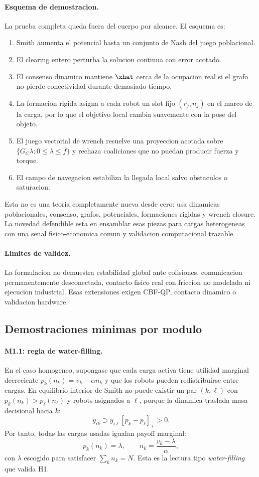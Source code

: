 \paragraph{Esquema de demostracion.}
La prueba completa queda fuera del cuerpo por alcance. El esquema es:
\begin{enumerate}[leftmargin=2em]
  \item Smith aumenta el potencial hasta un conjunto de Nash del juego poblacional.
  \item El clearing entero perturba la solucion continua con error acotado.
  \item El consenso dinamico mantiene $\xhat$ cerca de la ocupacion real si el grafo no
  pierde conectividad durante demasiado tiempo.
  \item La formacion rigida asigna a cada robot un slot fijo $(r_j,n_j)$ en el marco de
  la carga, por lo que el objetivo local cambia suavemente con la pose del objeto.
  \item El juego vectorial de wrench resuelve una proyeccion acotada sobre
  $\{G_C\lambda: 0\le\lambda\le\bar f\}$ y rechaza coaliciones que no puedan producir
  fuerza y torque.
  \item El campo de navegacion estabiliza la llegada local salvo obstaculos o saturacion.
\end{enumerate}

Esta no es una teoria completamente nueva desde cero: usa dinamicas poblacionales,
consenso, grafos, potenciales, formaciones rigidas y wrench closure. La novedad
defendible esta en ensamblar esas piezas para cargas heterogeneas con una senal
fisico-economica comun y validacion computacional trazable.

\paragraph{Limites de validez.}
La formulacion no demuestra estabilidad global ante colisiones, comunicacion
permanentemente desconectada, contacto fisico real con friccion no modelada ni ejecucion
industrial. Esas extensiones exigen CBF-QP, contacto dinamico o validacion hardware.

\subsection*{Demostraciones minimas por modulo}

\paragraph{M1.1: regla de water-filling.}
En el caso homogeneo, supongase que cada carga activa tiene utilidad marginal decreciente
$p_k(n_k)=v_k-\alpha n_k$ y que los robots pueden redistribuirse entre cargas. En
equilibrio interior de Smith no puede existir un par $(k,\ell)$ con
$p_k(n_k)>p_\ell(n_\ell)$ y robots asignados a $\ell$, porque la dinamica traslada masa
decisional hacia $k$:
\[
  \dot y_{i k} \supset y_{i\ell}[p_k-p_\ell]_+ > 0 .
\]
Por tanto, todas las cargas usadas igualan payoff marginal:
\[
  p_k(n_k)=\lambda,\qquad
  n_k=\frac{v_k-\lambda}{\alpha},
\]
con $\lambda$ escogido para satisfacer $\sum_k n_k=N$. Esta es la lectura tipo
\emph{water-filling} que valida H1.

